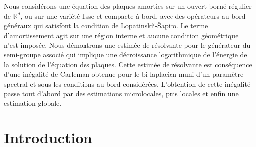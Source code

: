 \documentclass[JEP,XML,SOM,Unicode,published]{cedram}
\theoremstyle{plain}
\theoremstyle{definition}
\begin{document}
\begin{altabstract}
Nous considérons une équation des plaques amorties sur un ouvert borné régulier de $\mathbb{R}^d$, ou sur une variété lisse et compacte à bord, avec des opérateurs au bord généraux qui satisfont la condition de Lopatinski\u{\i}-\v{S}apiro. Le terme d'amortissement agit sur une région interne et aucune condition géométrique n'est imposée. Nous démontrons une estimée de résolvante pour le générateur du semi-groupe associé qui implique une décroissance logarithmique de l'énergie de la solution de l'équation des plaques. Cette estimée de résolvante est conséquence d'une inégalité de Carleman obtenue pour le bi-laplacien muni d'un paramètre spectral et sous les conditions au bord considérées. L'obtention de cette inégalité passe tout d'abord par des estimations microlocales, puis locales et enfin une estimation globale.
\end{altabstract}
\maketitle
\vspace*{-\baselineskip}
\tableofcontents


\section{Introduction}
\end{document}
